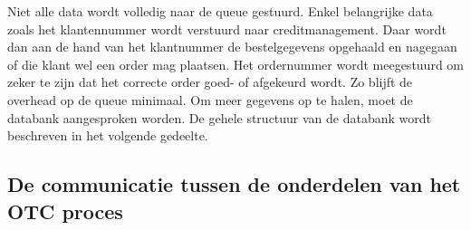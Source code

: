 Niet alle data wordt volledig naar de queue gestuurd. Enkel belangrijke data zoals het klantennummer wordt verstuurd naar creditmanagement. Daar wordt dan aan de hand van het klantnummer de bestelgegevens opgehaald en nagegaan of die klant wel een order mag plaatsen. Het ordernummer wordt meegestuurd om zeker te zijn dat het correcte order goed- of afgekeurd wordt. Zo blijft de overhead op de queue minimaal. Om meer gegevens op te halen, moet de databank aangesproken worden. De gehele structuur van de databank wordt beschreven in het volgende gedeelte.

\subsection{De communicatie tussen de onderdelen van het OTC proces}

